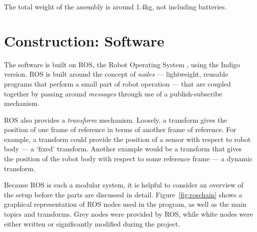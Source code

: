 \documentclass[12pt,oneside,a4paper,draft]{book}
\begin{document}
The total weight of the assembly is around 1.4kg, not including batteries.

\chapter{Construction: Software}
\label{sec:software}

The software is built on ROS, the Robot Operating System
\cite{rosos}, using the Indigo version. ROS is built around the
concept of \emph{nodes} --- lightweight, reusable programs that perform a small
part of robot operation --- that are coupled together by passing
around \emph{messages} through use of a publish-subscribe mechanism.

ROS also provides a \emph{transform} mechanism. Loosely, a transform
gives the position of one frame of reference in terms of another frame
of reference. For example, a transform could provide the position of a
sensor with respect to robot body --- a `fixed' transform. Another
example would be a transform that gives the position of the robot body with
respect to some reference frame --- a dynamic transform.

Because ROS is such a modular system, it is helpful to consider an
overview of the setup before the parts are discussed in
detail. Figure~\ref{fig:roschain} shows a graphical representation of
ROS nodes used in the program, as well as the main topics and
transforms. Grey nodes were provided by ROS, while white nodes were
either written or significantly modified during the project.
\end{document}
